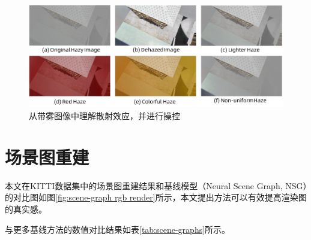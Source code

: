 \begin{figure}[ht]
    \centering
    \includegraphics[width=\textwidth]{undergraduate-thesis/images/experiments/haze-manipulation.pdf}
    \caption{从带雾图像中理解散射效应，并进行操控}
    \label{fig:dehazenerf-manipulation}
\end{figure}

\newpage
\section{场景图重建}
本文在KITTI数据集中的场景图重建结果和基线模型（Neural Scene Graph, NSG\cite{ost_neural_2021}）的对比图如图\ref{fig:scene-graph rgb render}所示，本文提出方法可以有效提高渲染图的真实感。

\begin{table}[ht]
\centering
\caption{场景图模型的数值对比结果}
\label{tab:scene-graphs}
\end{table}


 

与更多基线方法的数值对比结果如表\ref{tab:scene-graphs}所示。

